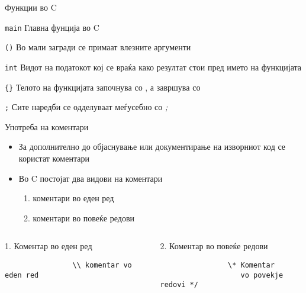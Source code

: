 \begin{frame}[shrink=10]{Функции во C}
 	\hfill
  	\begin{block}{\texttt{main}}
  		Главна фунција во C
  	\end{block}
  	
  	\begin{block}{\texttt{()}}
		Во мали загради се примаат влезните аргументи
  	\end{block}
  	
  	\begin{block}{\texttt{int}}
		Видот на податокот кој се враќа како резултат стои пред името на функцијата
  	\end{block}
  	
  	\begin{block}{\texttt{\{\}}}
		Телото на функцијата започнува со {, а завршува со }
  	\end{block}

	\begin{block}{\texttt{;}}
  	Сите наредби се одделуваат меѓусебно со \emph{;}
  	\end{block}

\end{frame}

\begin{frame}[fragile]{Употреба на коментари}
	\begin{itemize}
		\item За дополнително до објаснување или документирање на изворниот код се користат коментари
		\item Во C постојат два видови на коментари
		\begin{enumerate}
			\item коментари во еден ред
			\item коментари во повеќе редови
		\end{enumerate}	
		
	\end{itemize}
		
	\begin{columns}[t]
			\begin{block}{1. Коментар во еден ред}
				\begin{verbatim}
				\\ komentar vo eden red
				\end{verbatim}
			\end{block}
			\begin{block}{2. Коментар во повеќе редови}
				\begin{verbatim}
				\* Komentar 
				   vo povekje redovi */
				\end{verbatim}
			\end{block}
	\end{columns}		

\end{frame}

